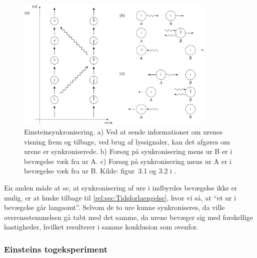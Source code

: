 \begin{figure}
    \centering
    \includegraphics[width=0.85\textwidth]{Rel/RelLorent/EinsteinSynkronisering.png}
    \caption{Einsteinsynkronisering. a) Ved at sende informationer om urenes
visning frem og tilbage, ved brug af lyssignaler, kan det afgøres om urene er synkroniserede. b) Forsøg på synkronisering mens ur B er i bevægelse væk fra ur A. c) Forsøg på synkronisering mens ur A er i bevægelse væk fra ur B. \newline Kilde: figur~3.1 og 3.2 i \cite{uggerhojSpecielRelativitetsteori2016}.}
    \label{rel:fig:EinsteinSyncronization}
\end{figure}

En anden måde at se, at synkronisering af ure i indbyrdes bevægelse ikke er mulig, er at huske tilbage til \cref{rel:sec:Tidsforlaengelse}, hvor vi så, at ``et ur i bevægelse går langsomt''. Selvom de to ure kunne synkroniseres, da ville overensstemmelsen gå tabt med det samme, da urene bevæger sig med forskellige hastigheder, hvilket resulterer i samme konklusion som ovenfor.


\subsubsection{Einsteins togeksperiment} \label{rel:sec:tog}


